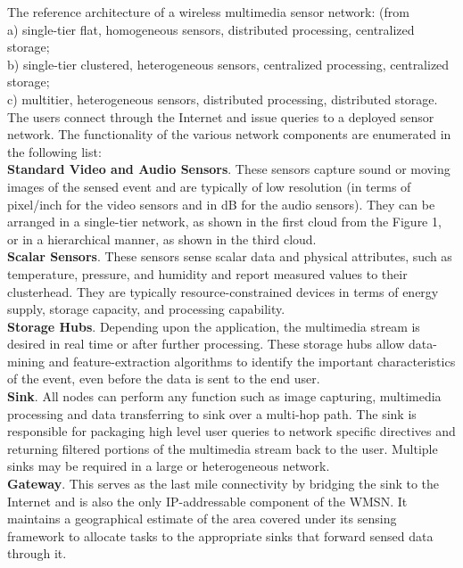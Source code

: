 \documentclass[conference]{IEEEtran}
\begin{document}
The reference architecture of a wireless multimedia sensor network: (from \citet{Inaf02}
\\ \indent a) single-tier flat, homogeneous sensors, distributed processing, centralized storage; 
\\ \indent b) single-tier clustered, heterogeneous sensors, centralized processing, centralized storage; 
\\ \indent c) multitier, heterogeneous sensors, distributed processing, distributed storage.
\\ \indent The users connect through the Internet and issue queries to a deployed sensor network. The functionality of the various network components are enumerated in the following list:
\\ \indent \textbf{Standard Video and Audio Sensors}. These sensors capture sound or moving images of the sensed event and are typically of low resolution (in terms of pixel/inch for the video sensors and in dB for the audio sensors). They can be arranged in a single-tier network, as shown in the first cloud from the Figure 1, or in a hierarchical manner, as shown in the third cloud.
\\ \indent \textbf{Scalar Sensors}. These sensors sense scalar data and physical attributes, such as temperature, pressure, and humidity and report measured values to their clusterhead. They are typically resource-constrained devices in terms of energy supply, storage capacity, and processing capability.
\\ \indent \textbf{Storage Hubs}. Depending upon the application, the multimedia stream is desired in real time or after further processing. These storage hubs allow data-mining and feature-extraction algorithms to identify the important characteristics of the event, even before the data is sent to the end user.
\\ \indent \textbf{Sink}. All nodes can perform any function such as image capturing, multimedia processing and data transferring to sink over a multi-hop path. The sink is responsible for packaging high level user queries to network specific directives and returning filtered portions of the multimedia stream back to the user. Multiple sinks may be required in a large or heterogeneous network.
\\ \indent \textbf{Gateway}. This serves as the last mile connectivity by bridging the sink to the Internet and is also the only IP-addressable component of the WMSN. It maintains a geographical estimate of the area covered under its sensing framework to allocate tasks to the appropriate sinks that forward sensed data through it.
\end{document}
